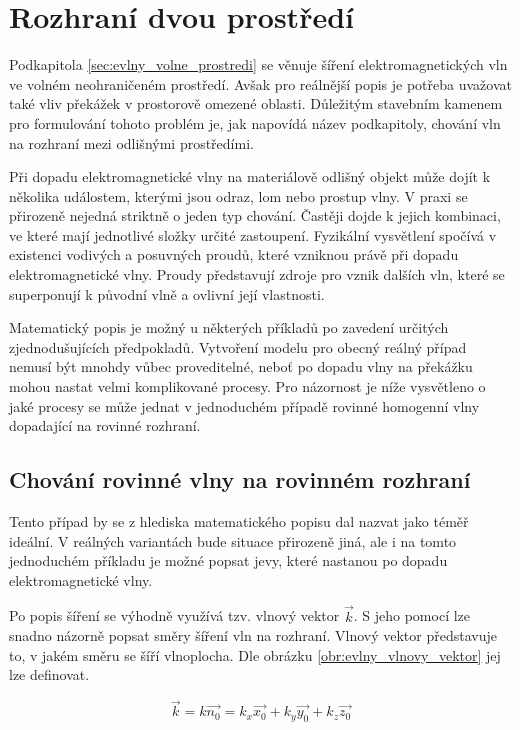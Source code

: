 \section{Rozhraní dvou prostředí}
Podkapitola \ref{sec:evlny_volne_prostredi} se věnuje šíření elektromagnetických vln ve volném neohraničeném prostředí. Avšak pro reálnější popis je potřeba uvažovat také vliv překážek v prostorově omezené oblasti. Důležitým stavebním kamenem pro formulování tohoto problém je, jak napovídá název podkapitoly, chování vln na rozhraní mezi odlišnými prostředími.

Při dopadu elektromagnetické vlny na materiálově odlišný objekt může dojít k několika událostem, kterými jsou odraz, lom nebo prostup vlny. V praxi se přirozeně nejedná striktně o jeden typ chování. Častěji dojde k jejich kombinaci, ve které mají jednotlivé složky určité zastoupení. Fyzikální vysvětlení spočívá v existenci vodivých a posuvných proudů, které vzniknou právě při dopadu elektromagnetické vlny. Proudy představují zdroje pro vznik dalších vln, které se superponují k původní vlně a ovlivní její vlastnosti. 

Matematický popis je možný u některých příkladů po zavedení určitých zjednodušujících předpokladů. Vytvoření modelu pro obecný reálný případ nemusí být mnohdy vůbec proveditelné, neboť po dopadu vlny na překážku mohou nastat velmi komplikované procesy. Pro názornost je níže vysvětleno o jaké procesy se může jednat v jednoduchém případě rovinné homogenní vlny dopadající na rovinné rozhraní.

\subsection*{Chování rovinné vlny na rovinném rozhraní}
Tento případ by se z hlediska matematického popisu dal nazvat jako téměř ideální. V reálných variantách bude situace přirozeně jiná, ale i na tomto jednoduchém příkladu je možné popsat jevy, které nastanou po dopadu elektromagnetické vlny. 

Po popis šíření se výhodně využívá tzv. vlnový vektor $\vec k$. S jeho pomocí lze snadno názorně popsat směry šíření vln na rozhraní. Vlnový vektor představuje to, v jakém směru se šíří vlnoplocha. Dle obrázku \ref{obr:evlny_vlnovy_vektor} jej lze definovat.

\begin{displaymath}
	\vec k = k \vec{n_{0}} = k_{x}\vec{x_{0}} +  k_{y}\vec{y_{0}} +  k_{z}\vec{z_{0}}
\end{displaymath}


